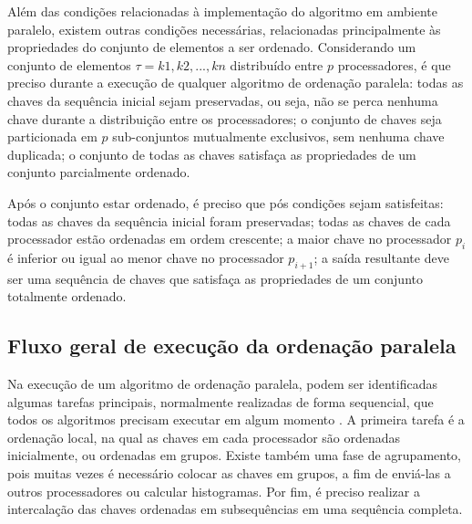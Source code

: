 Além das condições relacionadas à implementação do algoritmo em ambiente paralelo, existem outras condições necessárias, relacionadas principalmente às propriedades do conjunto de elementos a ser ordenado. Considerando um conjunto de elementos $ \tau = {k1, k2, ... , kn} $ distribuído entre $p$ processadores, é que preciso durante a execução de qualquer algoritmo de ordenação paralela: todas as chaves da sequência inicial sejam preservadas, ou seja, não se perca nenhuma chave durante a distribuição entre os processadores; o conjunto de chaves seja particionada em $p$ sub-conjuntos mutualmente exclusivos, sem nenhuma chave duplicada; o conjunto de todas as chaves satisfaça as propriedades de um conjunto parcialmente ordenado.

Após o conjunto estar ordenado, é preciso que pós condições sejam satisfeitas:
todas as chaves da sequência inicial foram preservadas; todas as chaves de cada processador estão ordenadas em ordem crescente; a maior chave no processador $p_{i}$ é inferior ou igual ao menor chave no processador $p_{i+1}$; a saída resultante deve ser uma sequência de chaves que satisfaça as propriedades de um conjunto totalmente ordenado.


\subsection{Fluxo geral de execução da ordenação paralela}

Na execução de um algoritmo de ordenação paralela, podem ser identificadas algumas tarefas principais, normalmente realizadas de forma sequencial, que todos os algoritmos precisam executar em algum momento \cite{Kale:2010}. 
A primeira tarefa é a ordenação local, na qual as chaves em cada processador são ordenadas inicialmente, ou ordenadas em grupos.
Existe também uma fase de agrupamento, pois muitas vezes é necessário colocar as chaves em grupos, a fim de enviá-las a outros processadores ou calcular histogramas. Por fim, é preciso realizar a intercalação das chaves ordenadas em subsequências em uma sequência completa.




